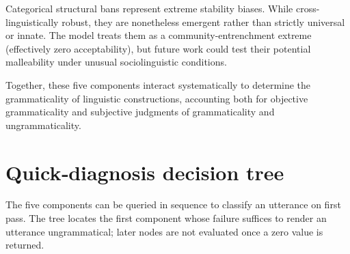 \documentclass[12pt]{article}
\begin{document}
Categorical structural bans represent extreme stability biases. While cross-linguistically robust, they are nonetheless emergent rather than strictly universal or innate. The model treats them as a community-entrenchment extreme (effectively zero acceptability), but future work could test their potential malleability under unusual sociolinguistic conditions.

Together, these five components interact systematically to determine the grammaticality of linguistic constructions, accounting both for objective grammaticality and subjective judgments of grammaticality and ungrammaticality.


\section{Quick‑diagnosis decision tree}

The five components can be queried in sequence to classify an utterance on first pass. The tree locates the first component whose failure suffices to render an utterance ungrammatical; later nodes are not evaluated once a zero value is returned.
\end{document}
